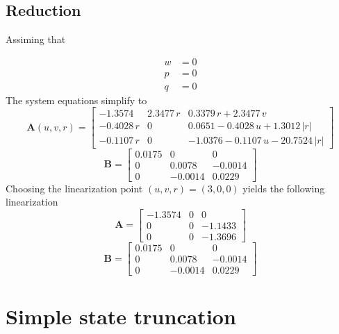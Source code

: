 \documentclass[12pt,a4]{article}
\begin{document}
\subsection{Reduction}

Assiming that

\begin{align*}
	w & = 0 \\
	p & = 0 \\
	q & = 0
\end{align*}
The system equations simplify to
\begin{equation}
	\bm{A}(u,v,r)  = \left[\begin{array}{ccc}
			-1.3574    & 2.3477\,r & 0.3379\,r+2.3477\,v                        \\
			-0.4028\,r & 0         & 0.0651 -0.4028\,u		+1.3012\,\left|r\right|   \\
			-0.1107\,r & 0         & -1.0376 -0.1107\,u		-20.7524\,\left|r\right|
		\end{array}\right]
\end{equation}
\begin{equation}
	\bm{B} = \left[\begin{array}{ccc} 0.0175 & 0 & 0\\ 0 & 0.0078 & -0.0014\\ 0 & -0.0014 & 0.0229 \end{array}\right]
\end{equation}
Choosing the linearization point $(u,v,r) = (3,0,0)$ yields the following linearization
\begin{equation*}
	\bm{A} = \left[\begin{array}{ccc} -1.3574 & 0 & 0\\ 0 & 0 & -1.1433\\ 0 & 0 & -1.3696 \end{array}\right]
\end{equation*}
\begin{equation}
	\bm{B} = \left[\begin{array}{ccc} 0.0175 & 0 & 0\\ 0 & 0.0078 & -0.0014\\ 0 & -0.0014 & 0.0229 \end{array}\right]
\end{equation}



\section{Simple state truncation}
\end{document}
